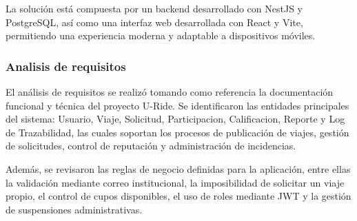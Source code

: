 \documentclass{article}
\begin{document}
La solución está compuesta por un backend desarrollado con NestJS y PostgreSQL, así como una interfaz web desarrollada con React y Vite, permitiendo una experiencia moderna y adaptable a dispositivos móviles.

\subsubsection{Analisis de requisitos}

El análisis de requisitos se realizó tomando como referencia la documentación funcional y técnica del proyecto U-Ride. Se identificaron las entidades principales del sistema: Usuario, Viaje, Solicitud, Participacion, Calificacion, Reporte y Log de Trazabilidad, las cuales soportan los procesos de publicación de viajes, gestión de solicitudes, control de reputación y administración de incidencias.

Además, se revisaron las reglas de negocio definidas para la aplicación, entre ellas la validación mediante correo institucional, la imposibilidad de solicitar un viaje propio, el control de cupos disponibles, el uso de roles mediante JWT y la gestión de suspensiones administrativas.
\end{document}
